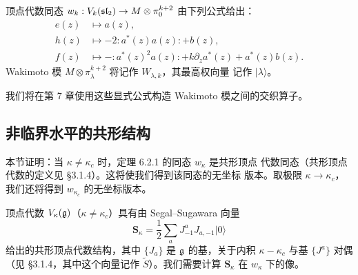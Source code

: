 顶点代数同态 $w_k:V_k(\mathfrak{sl}_2)\to M\otimes\pi_0^{k+2}$ 由下列公式给出：
\begin{equation}
    \begin{aligned}
        e(z)&\mapsto a(z),\\
        h(z)&\mapsto-2:\!a^*(z)a(z)\!:+b(z),\\
        f(z)&\mapsto-:\!a^*(z)^2a(z)\!:+k\partial_za^*(z)+a^*(z)b(z).
    \end{aligned}
    \tag{6.2-3}
\end{equation}
Wakimoto 模 $M\otimes\pi^{k+2}_\lambda$ 将记作 $W_{\lambda,k}$，其最高权向量
记作 $|\lambda\rangle$。

我们将在第 7 章使用这些显式公式构造 Wakimoto 模之间的交织算子。

\subsection{非临界水平的共形结构}

本节证明：当 $\kappa\ne\kappa_c$ 时，定理 6.2.1 的同态 $w_\kappa$ 是共形顶点
代数同态（共形顶点代数的定义见 \S3.1.4）。这将使我们得到该同态的无坐标
版本。取极限 $\kappa\to\kappa_c$，我们还将得到 $w_{\kappa_c}$ 的无坐标版本。

顶点代数 $V_\kappa(\mathfrak{g})$（$\kappa\ne\kappa_c$）具有由 Segal--Sugawara 向量
\begin{equation}
    \mathbf S_\kappa=\frac12\sum_aJ^a_{-1}J_{a,-1}|0\rangle
    \tag{6.2-4}
\end{equation}
给出的共形顶点代数结构，其中 $\{J_a\}$ 是 $\mathfrak{g}$ 的基，关于内积
$\kappa-\kappa_c$ 与基 $\{J^a\}$ 对偶（见 \S3.1.4，其中这个向量记作
$\widetilde S$）。我们需要计算 $\mathbf S_\kappa$ 在 $w_\kappa$ 下的像。

